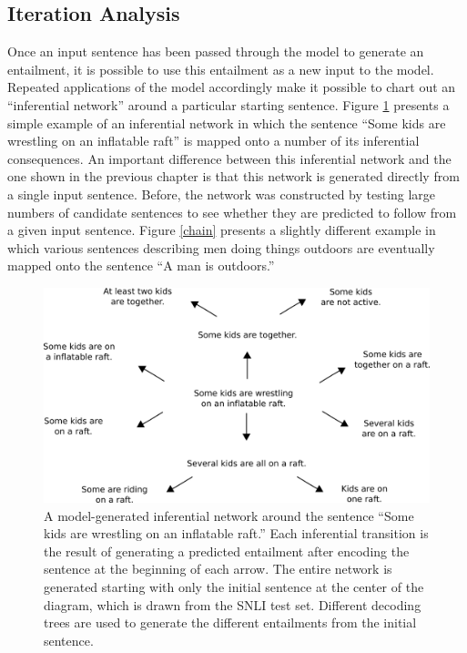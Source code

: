 \subsection{Iteration Analysis}\label{sec:iteration}

Once an input sentence has been passed through the model to generate an entailment, it is possible to use this entailment as a new input to the model. Repeated applications of the model accordingly make it possible to chart out an ``inferential network'' around a particular starting sentence. Figure \ref{inf-gen} presents a simple example of an inferential network in which the sentence ``Some kids are wrestling on an inflatable raft'' is mapped onto a number of its inferential consequences. An important difference between this inferential network and the one shown in the previous chapter is that this network is generated directly from a single input sentence. Before, the network was constructed by testing large numbers of candidate sentences to see whether they are predicted to follow from a given input sentence. Figure \ref{chain} presents a slightly different example in which various sentences describing men doing things outdoors are eventually mapped onto the sentence ``A man is outdoors.''

\begin{figure}[t]
\begin{center}
\includegraphics[width=5in]{figures/outward-inf-gen.png}
\end{center}
\caption{A model-generated inferential network around the sentence ``Some kids are wrestling on an inflatable raft.'' Each inferential transition is the result of generating a predicted entailment after encoding the sentence at the beginning of each arrow. The entire network is generated starting with only the initial sentence at the center of the diagram, which is drawn from the SNLI test set. Different decoding trees are used to generate the different entailments from the initial sentence.} 
\label{inf-gen}
\end{figure}

